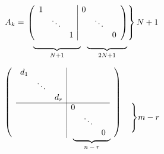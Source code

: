 \documentclass[12pt]{article}
\newcommand\undermat[2]{%
	\makebox[0pt][l]{$\smash{\underbrace{\phantom{%
					\begin{matrix}#2\end{matrix}}}_{\text{$#1$}}}$}#2}
\begin{document}
\begin{align*}
A_{k} &= \left.\left(
\begin{array}{ccc|ccc}
1 &  &  & 0\\
 & \ddots &  &  & \ddots\\
 &  & 1 &  &  & 0
\end{array}
\right)\right\}N+1\\[-0.5\normalbaselineskip]
      & \hspace{2em}\underbrace{\hspace{2cm}}_{N+1} 
        \hspace{\tabcolsep}
        \underbrace{\hspace{1.7cm}}_{2N+1}
 \end{align*}
 
\begin{align}
 	\begin{array}{cccc|ccccc}
 	\ldelim({7}{*} &d_1 &&&&&& \rdelim){7}{*}& \\
 	&& \ddots &&&&&& \\
 	&& & d_r &&&&&\\ \cline{2-7}
 	&&&& 0&&&& \rdelim\}{3}{*}[$m-r$] \\
 	&&&&& \ddots&&& \\
 	&&&& \undermat{n-r}{&& 0&&}
 	\end{array}\notag
\end{align}
 

 
\end{document}
